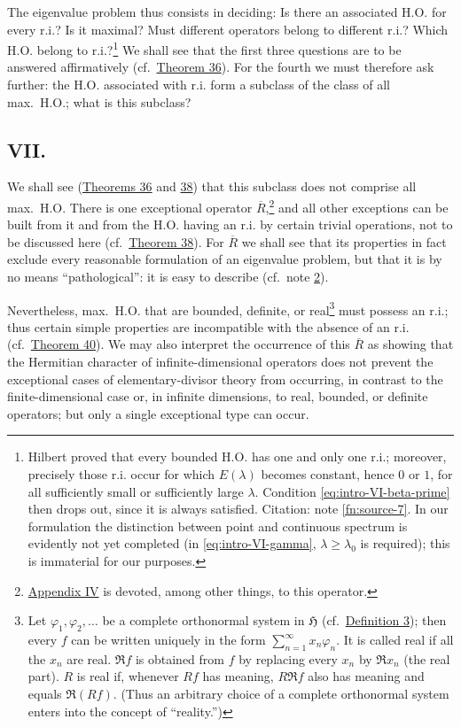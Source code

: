 ﻿\documentclass[paper=b5,fontsize=13pt,bookmarkpackage=false,twoside]{scrartcl}
\begin{document}
The eigenvalue problem thus consists in deciding: Is there an associated H.O. for every r.i.? Is it maximal? Must different operators belong to different r.i.? Which H.O. belong to r.i.?\footnote{\label{fn:source-18}Hilbert proved that every bounded H.O. has one and only one r.i.; moreover, precisely those r.i. occur for which $E(\lambda)$ becomes constant, hence $0$ or $1$, for all sufficiently small or sufficiently large $\lambda$. Condition \eqref{eq:intro-VI-beta-prime} then drops out, since it is always satisfied. Citation: note \ref{fn:source-7}. In our formulation the distinction between point and continuous spectrum is evidently not yet completed (in \eqref{eq:intro-VI-gamma}, $\lambda\ge\lambda_0$ is required); this is immaterial for our purposes.} We shall see that the first three questions are to be answered affirmatively (cf.\ \hyperref[thm:36]{Theorem 36}). For the fourth we must therefore ask further: the H.O. associated with r.i. form a subclass of the class of all max.\ H.O.; what is this subclass?

\subsection*{VII.}\label{intro:VII}

We shall see (\hyperref[thm:36]{Theorems 36} and \hyperref[thm:38]{38}) that this subclass does not comprise all max.\ H.O. There is one exceptional operator $\overline R$,\footnote{\label{fn:source-19}\hyperref[app:IV]{Appendix IV} is devoted, among other things, to this operator.} and all other exceptions can be built from it and from the H.O. having an r.i. by certain trivial operations, not to be discussed here (cf.\ \hyperref[thm:38]{Theorem 38}). For $\overline R$ we shall see that its properties in fact exclude every reasonable formulation of an eigenvalue problem, but that it is by no means ``pathological'': it is easy to describe (cf.\ note \ref{fn:source-19}).

Nevertheless, max.\ H.O. that are bounded, definite, or real\footnote{\label{fn:source-20}Let $\varphi_1,\varphi_2,\ldots$ be a complete orthonormal system in $\mathfrak H$ (cf.\ \hyperref[def:3]{Definition 3}); then every $f$ can be written uniquely in the form $\sum_{n=1}^{\infty}x_n\varphi_n$. It is called real if all the $x_n$ are real. $\mathfrak Rf$ is obtained from $f$ by replacing every $x_n$ by $\Re x_n$ (the real part). $R$ is real if, whenever $Rf$ has meaning, $R\mathfrak Rf$ also has meaning and equals $\mathfrak R(Rf)$. (Thus an arbitrary choice of a complete orthonormal system enters into the concept of ``reality.'')} must possess an r.i.; thus certain simple properties are incompatible with the absence of an r.i. (cf.\ \hyperref[thm:40]{Theorem 40}). We may also interpret the occurrence of this $\overline R$ as showing that the Hermitian character of infinite-dimensional operators does not prevent the exceptional cases of elementary-divisor theory from occurring, in contrast to the finite-dimensional case or, in infinite dimensions, to real, bounded, or definite operators; but only a single exceptional type can occur.
\end{document}
